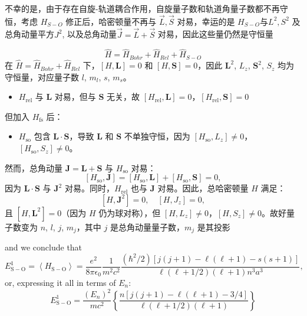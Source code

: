 不幸的是，由于存在自旋-轨道耦合作用，自旋量子数和轨道角量子数都不再守恒，考虑 \(H_{S-O}\) 修正后，哈密顿量不再与 ${\vec L, \vec S}$ 对易，幸运的是 ${H_{S - O}}$与${L^2},{S^2}$ 及总角动量平方\({J^2}\), 以及总角动量$\vec J=\vec L+\vec S$ 对易，因此这些量仍然是守恒量
\begin{center}
\end{center}
\begin{proofbox}
	\[\hat H = \hat H_{Bohr} + \hat H_{Rel} + \hat H_{S-O}\]
	在 $\hat H =\hat H_{Bohr} + \hat H_{Rel}$ 下，$[H, \mathbf{L}] = 0$ 和 $[H, \mathbf{S}] = 0$，因此 $\mathbf{L}^2$, $L_z$, $\mathbf{S}^2$, $S_z$ 均为守恒量，对应量子数 $l$, $m_l$, $s$, $m_s$。
	\begin{itemize}
		\item $H_{\text{rel}}$ 与 $\mathbf{L}$ 对易，但与 $\mathbf{S}$ 无关，故 $[H_{\text{rel}}, \mathbf{L}] = 0$，$[H_{\text{rel}}, \mathbf{S}] = 0$
	\end{itemize}
	
	但加入 $H_{\text{fs}}$ 后：
	\begin{itemize}
		
		\item $H_{\text{so}}$ 包含 $\mathbf{L} \cdot \mathbf{S}$，导致 $\mathbf{L}$ 和 $\mathbf{S}$ 不单独守恒，因为 $[H_{\text{so}}, L_z] \neq 0$，$[H_{\text{so}}, S_z] \neq 0$。
	\end{itemize}
	
	然而，总角动量 $\mathbf{J} = \mathbf{L} + \mathbf{S}$ 与 $H_{\text{so}}$ 对易：
	\[
	[H_{\text{so}}, \mathbf{J}] = [H_{\text{so}}, \mathbf{L}] + [H_{\text{so}}, \mathbf{S}] = 0,
	\]
	因为 $\mathbf{L} \cdot \mathbf{S}$ 与 $\mathbf{J}^2$ 对易。同时，$H_{\text{rel}}$ 也与 $\mathbf{J}$ 对易。因此，总哈密顿量 $H$ 满足：
	\[
	[H, \mathbf{J}^2] = 0, \quad [H, J_z] = 0,
	\]
	且 $[H, \mathbf{L}^2] = 0$（因为 $H$ 仍为球对称），但 $[H, L_z] \neq 0$，$[H, S_z] \neq 0$。故好量子数变为 $n$, $l$, $j$, $m_j$，其中 $j$ 是总角动量量子数，$m_j$ 是其投影
\end{proofbox}
and we conclude that
\[E_{\mathrm{S-O}}^{1}=\left\langle H_{\mathrm{S-O}}\right\rangle=\frac{e^{2}}{8 \pi \epsilon_{0}} \frac{1}{m^{2} c^{2}} \frac{\left(\hbar^{2} / 2\right)\left[j(j+1)-\ell(\ell+1)-s(s+1)\right]}{\ell(\ell+1 / 2)(\ell+1) n^{3} a^{3}},\]
or, expressing it all in terms of $E_{n}$:
\[ E_{\mathrm{S-O}}^{1}=\frac{\left(E_{n}\right)^{2}}{m c^{2}}\left\{\frac{n\left[j(j+1)-\ell(\ell+1)-3 / 4\right]}{\ell(\ell+1 / 2)(\ell+1)}\right\} \]
